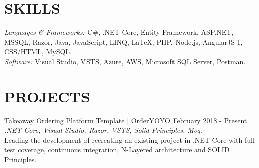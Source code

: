 \documentclass[margin, 10pt, hidelinks]{res} %
\newcommand{\tab}{\hspace*{1em}} %
\begin{document}
\begin{resume}


\section{SKILLS}

{\sl\large Languages \& Frameworks:} 
C\#, .NET Core, Entity Framework, ASP.NET, MSSQL, Razor, Java, JavaScript, LINQ, LaTeX,
{\color{black!70}PHP, Node.js, AngularJS 1, CSS/HTML, MySQL.} \\ 
{\sl\large  Software:} Visual Studio, VSTS, Azure, AWS, Microsoft SQL Server, Postman. 
\section{PROJECTS}

Takeaway Ordering Platform Template | \href{https://orderyoyo.com/}{\underline{OrderYOYO}} \hfill February 2018  - Present\\
{\it .NET Core, Visual Studio, Razor, VSTS, Solid Principles, Moq.} \\
\tab Leading the development of recreating an existing project in .NET Core with full test coverage, continuous integration, N-Layered architecture and SOLID Principles.


\end{resume}
\end{document}
